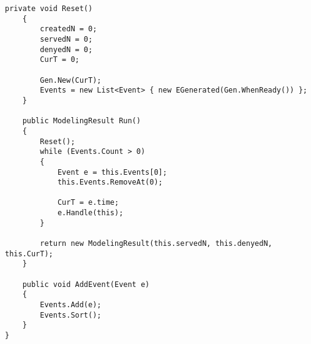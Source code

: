 \begin{lstlisting}[caption = {Реализация модели}, label=lst:prog]
	private void Reset()
	{
		createdN = 0;
		servedN = 0;
		denyedN = 0;
		CurT = 0;
		
		Gen.New(CurT);
		Events = new List<Event> { new EGenerated(Gen.WhenReady()) };
	}
	
	public ModelingResult Run()
	{
		Reset();
		while (Events.Count > 0)
		{
			Event e = this.Events[0];
			this.Events.RemoveAt(0);
			
			CurT = e.time;
			e.Handle(this);
		}
		
		return new ModelingResult(this.servedN, this.denyedN, this.CurT);
	}
	
	public void AddEvent(Event e)
	{
		Events.Add(e);
		Events.Sort();
	}
}
\end{lstlisting}
